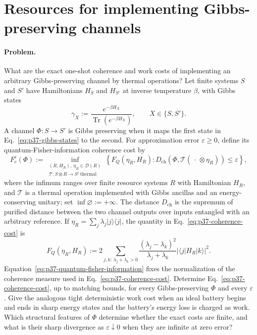 \section{Resources for implementing Gibbs-preserving channels}
\label{sec:op_56578531a2c610fe}

\paragraph{Problem.}
What are the exact one-shot coherence and work costs of implementing an
arbitrary Gibbs-preserving channel by thermal operations?  Let finite systems
$S$ and $S'$ have Hamiltonians $H_S$ and $H_{S'}$ at inverse temperature
$\beta$, with Gibbs states
\begin{equation}
  \gamma_X:=\frac{e^{-\beta H_X}}{\operatorname{Tr}(e^{-\beta H_X})},
  \qquad X\in\{S,S'\}.
  \label{eq:p37-gibbs-states}
\end{equation}
A channel $\Phi:S\to S'$ is Gibbs preserving when it maps the first state in
Eq.~\eqref{eq:p37-gibbs-states} to the second.  For approximation error
$\varepsilon\geq0$, define its quantum-Fisher-information coherence cost by
\begin{equation}
  F_c^{\varepsilon}(\Phi)
  :=\inf_{\substack{(R,H_R),\ \eta_R\in\mathcal D(R)\\
                    \mathcal T:S\otimes R\to S'\ \mathrm{thermal}}}
  \left\{
    F_Q(\eta_R,H_R):
    D_{\mathrm{ch}}\!\left(
      \Phi,\mathcal T(\,\cdot\,\otimes\eta_R)
    \right)\leq\varepsilon
  \right\},
  \label{eq:p37-coherence-cost}
\end{equation}
where the infimum ranges over finite resource systems $R$ with Hamiltonian
$H_R$, and $\mathcal T$ is a thermal operation implemented with Gibbs
ancillas and an energy-conserving unitary; set $\inf\varnothing:=+\infty$.
The distance $D_{\mathrm{ch}}$ is the supremum
of purified distance between the two channel outputs over inputs entangled
with an arbitrary reference.  If
$\eta_R=\sum_j\lambda_j\lvert j\rangle\!\langle j\rvert$, the quantity in
Eq.~\eqref{eq:p37-coherence-cost} is
\begin{equation}
  F_Q(\eta_R,H_R)
  :=2\!\sum_{j,k:\,\lambda_j+\lambda_k>0}
  \frac{(\lambda_j-\lambda_k)^2}{\lambda_j+\lambda_k}
  \left\lvert\langle j\rvert H_R\lvert k\rangle\right\rvert^2.
  \label{eq:p37-quantum-fisher-information}
\end{equation}
Equation~\eqref{eq:p37-quantum-fisher-information} fixes the normalization of
the coherence measure used in Eq.~\eqref{eq:p37-coherence-cost}.
Determine Eq.~\eqref{eq:p37-coherence-cost}, up to matching bounds, for every
Gibbs-preserving $\Phi$ and every $\varepsilon$.  Give the analogous tight
deterministic work cost when an ideal battery begins and ends in sharp energy
states and the battery's energy loss is charged as work.  Which structural
features of $\Phi$ determine whether the exact costs are finite, and what is
their sharp divergence as $\varepsilon\downarrow0$ when they are infinite at
zero error?

